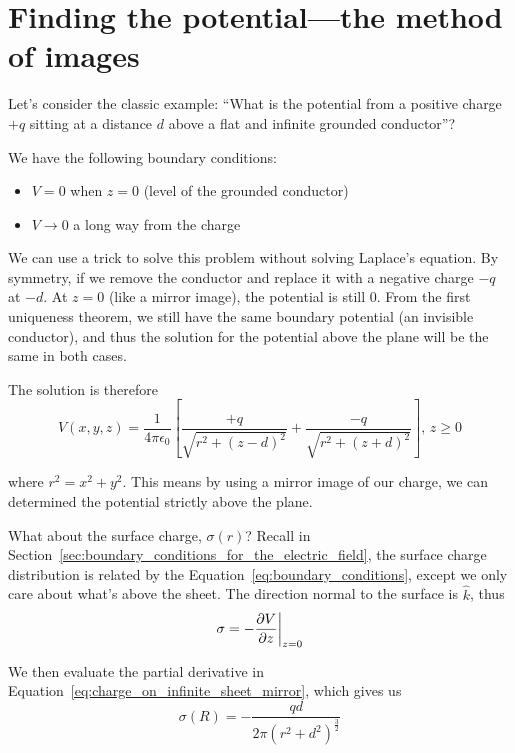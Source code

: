 \documentclass[12pt,chapterprefix=false,dvipsnames]{scrbook}
\theoremstyle{dotless}
\theoremstyle{definition}
\begin{document}
\section{Finding the potential---the method of images}%
\label{sec:finding_the_potential}%

Let's consider the classic example: ``What is the potential from
a positive charge $+q$ sitting at a distance
$d$ above a flat and infinite grounded
conductor''?

We have the following boundary conditions:
\begin{itemize}
	\item $V = 0$ when $z = 0$ (level of the
	      grounded conductor)
	\item $V \rightarrow 0$ a long way from the
	      charge
\end{itemize}

We can use a trick to solve this problem without solving
Laplace's equation. By symmetry, if we remove the conductor and
replace it with a negative charge $-q$ at
$-d$. At $z = 0$ (like a
mirror image), the potential is still 0. From the first
uniqueness theorem, we still have the same boundary potential
(an invisible conductor), and thus the solution for the
potential above the plane will be the same in both cases.

The solution is therefore
\begin{equation}
	\label{eq:charge_on_infinite_sheet_mirror}
	V(x,y,z) = \frac{1}{4\pi\epsilon_{0}}\left[\frac{+q}{\sqrt{r^2 +
	{(z-d)}^2}} + \frac{-q}{\sqrt{r^2 + {(z+d)}^2}} \right],\, z
	\geq 0
\end{equation}

where $r^2 = x^2 + y^2$. This means by using a mirror
image of our charge, we can determined the potential strictly
above the plane.

What about the surface charge, $\sigma(r)$? Recall
in Section~\ref{sec:boundary_conditions_for_the_electric_field}, the surface charge
distribution is related by the
Equation~\ref{eq:boundary_conditions}, except we only care about
what's above the sheet. The direction normal to the surface is
$\hat{k}$, thus
\begin{equation}
	\sigma = -\pdv{V}{z}\biggr \rvert_{z=0}
\end{equation}

We then evaluate the partial derivative in
Equation~\ref{eq:charge_on_infinite_sheet_mirror}, which gives us
\begin{equation}
	\sigma(R) =
	-\frac{qd}{2\pi{(r^2+d^2)}^{\frac{3}{2}}}
\end{equation}
\end{document}
